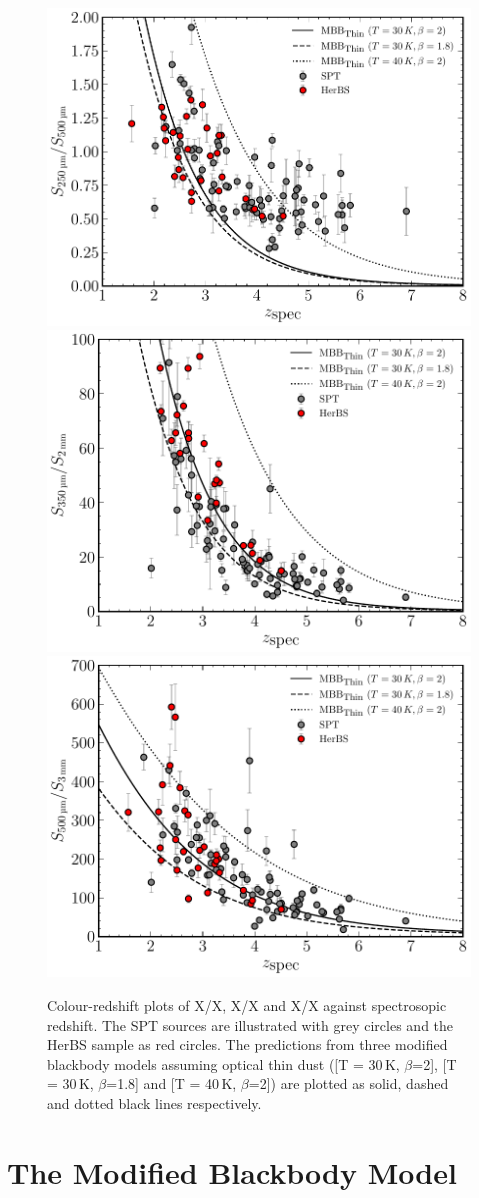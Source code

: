 \begin{figure}
    \centering
    \includegraphics[width=0.5\columnwidth,height=0.26\textheight]{Figures/spt_herbs_colour_250_500.pdf}
    \includegraphics[width=0.5\columnwidth,height=0.26\textheight]{Figures/spt_herbs_colour_350_2000.pdf}
    \includegraphics[width=0.5\columnwidth,height=0.26\textheight]{Figures/spt_herbs_colour_500_3000.pdf}
    \caption{Colour-redshift plots of X/X, X/X and X/X against spectrosopic redshift. The SPT sources are illustrated with grey circles and the HerBS sample as red circles. The predictions from three modified blackbody models assuming optical thin dust ([T = 30\,K, $\beta$=2], [T = 30\,K, $\beta$=1.8] and [T = 40\,K, $\beta$=2]) are plotted as solid, dashed and dotted black lines respectively.}
    \label{fig:spt_herbs_colour_redshift}
\end{figure}


\section{The Modified Blackbody Model}

